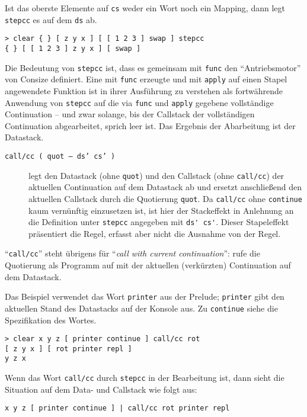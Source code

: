 Ist das oberste Elemente auf \verb|cs| weder ein Wort noch ein Mapping, dann legt \verb|stepcc| es auf dem \verb|ds| ab.

\begin{verbatim}
> clear { } [ z y x ] [ [ 1 2 3 ] swap ] stepcc
{ } [ [ 1 2 3 ] z y x ] [ swap ]
\end{verbatim}

\attention Die Bedeutung von \verb|stepcc| ist, dass es gemeinsam mit \verb|func| den "`Antriebsmotor"' von Consize definiert. Eine mit \verb|func| erzeugte und mit \verb|apply| auf einen Stapel angewendete Funktion ist in ihrer Ausführung zu verstehen als fortwährende Anwendung von \verb|stepcc| auf die via \verb|func| und \verb|apply| gegebene vollständige Continuation -- und zwar solange, bis der Callstack der vollständigen Continuation abgearbeitet, sprich leer ist. Das Ergebnis der Abarbeitung ist der Datastack.

\begin{description}
\item[\texttt{call/cc ( quot -- ds' cs' )}] legt den Datastack (ohne \verb|quot|) und den Callstack (ohne \verb|call/cc|) der aktuellen Continuation auf dem Datastack ab und ersetzt anschließend den aktuellen Callstack durch die Quotierung \verb|quot|. Da \verb|call/cc| ohne \verb|continue| kaum vernünftig einzusetzen ist, ist hier der Stackeffekt in Anlehnung an die Definition unter \verb|stepcc| angegeben mit \verb|ds' cs'|. Dieser Stapeleffekt präsentiert die Regel, erfasst aber nicht die Ausnahme von der Regel.
\end{description}

"`\verb|call/cc|"' steht übrigens für "`\emph{call with current continuation}"': rufe die Quotierung als Programm auf mit der aktuellen (verkürzten) Continuation auf dem Datastack.

Das Beispiel verwendet das Wort \verb|printer| aus der Prelude; \verb|printer| gibt den aktuellen Stand des Datastacks auf der Konsole aus. Zu \verb|continue| siehe die Spezifikation des Wortes.

\begin{verbatim}
> clear x y z [ printer continue ] call/cc rot
[ z y x ] [ rot printer repl ]
y z x
\end{verbatim}

Wenn das Wort \verb|call/cc| durch \verb|stepcc| in der Bearbeitung ist, dann sieht die Situation auf dem Data- und Callstack wie folgt aus:

\begin{verbatim}
x y z [ printer continue ] | call/cc rot printer repl
\end{verbatim}

